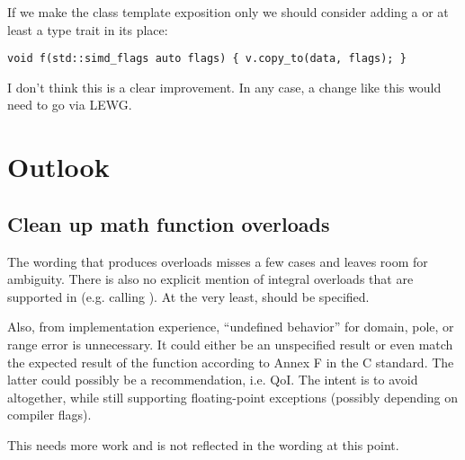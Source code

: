 If we make the  class template exposition only we should
consider adding a  or at least a type trait in its place:
\medskip\begin{lstlisting}[style=Vc]
void f(std::simd_flags auto flags) { v.copy_to(data, flags); }
\end{lstlisting}
I don't think this is a clear improvement.
In any case, a change like this would need to go via LEWG.

\section{Outlook}
\subsection{Clean up math function overloads}
The wording that produces \simd overloads misses a few cases and leaves room for ambiguity.
There is also no explicit mention of integral overloads that are supported in  (e.g. \std{} calling \std{}).
At the very least, \std{} should be specified.

Also, from implementation experience, ``undefined behavior'' for domain, pole,
or range error is unnecessary.
It could either be an unspecified result or even match the expected result of
the function according to Annex F in the C standard.
The latter could possibly be a recommendation, i.e. QoI.
The intent is to avoid  altogether, while still supporting
floating-point exceptions (possibly depending on compiler flags).

This needs more work and is not reflected in the wording at this point.

